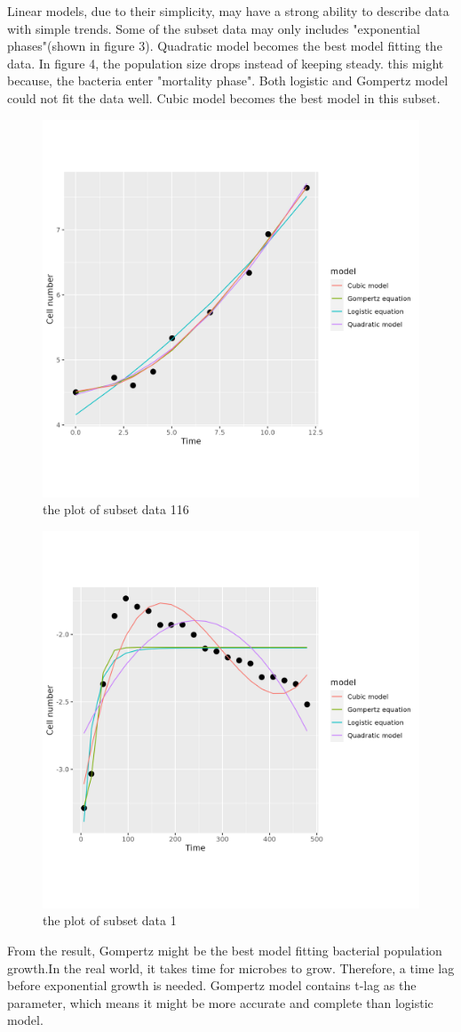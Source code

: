 \documentclass{article}
\begin{document}
Linear models, due to their simplicity, may have a strong ability to describe data with simple trends. Some of the subset data may only includes "exponential phases"(shown in figure 3). Quadratic model becomes the best model fitting the data. In figure 4, the population size drops instead of keeping steady. this might because, the bacteria enter "mortality phase". Both logistic and Gompertz model could not fit the data well. Cubic model becomes the best model in this subset.
\begin{figure}
    \centering
    \includegraphics[width=0.5\linewidth]{../results/subset_ 116 _plot.png}
    \caption{the plot of subset data 116}
    \label{fig:subset1-plot116}
\end{figure}

\begin{figure}
  \centering
    \includegraphics[width=0.5\linewidth]{../results/subset_ 1 _plot.png}
    \caption{the plot of subset data 1 }
    \label{fig:subset1-plot1}
\end{figure}

From the result, Gompertz might be the best model fitting bacterial population growth.In the real world, it takes time for microbes to grow. Therefore, a time lag before exponential growth is needed. Gompertz model contains t-lag as the parameter, which means it might be more accurate and complete than logistic model. 
\end{document}
